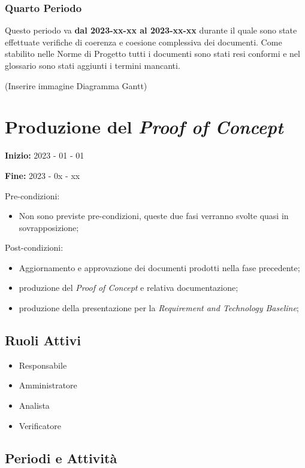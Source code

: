 \subsubsection{Quarto Periodo}
Questo periodo va \textbf{dal 2023-xx-xx al 2023-xx-xx} durante il quale sono state effettuate verifiche di coerenza e coesione complessiva dei documenti. Come stabilito nelle Norme di Progetto tutti i documenti sono stati resi conformi e nel glossario sono stati aggiunti i termini mancanti.

(Inserire immagine Diagramma Gantt)

\section{Produzione del {\it{Proof of Concept}}}

\textbf{Inizio:} 2023 - 01 - 01 

\textbf{Fine:} 2023 - 0x - xx

Pre-condizioni:
\begin{itemize}
    \item Non sono previste pre-condizioni, queste due fasi verranno svolte quasi in sovrapposizione;
\end{itemize}

Post-condizioni:
    \begin{itemize}
        \item Aggiornamento e approvazione dei documenti prodotti nella fase precedente;
        \item produzione del {\it{Proof of Concept}} e relativa documentazione;
        \item produzione della presentazione per la {\it{Requirement and Technology Baseline}};
    \end{itemize}

\subsection{Ruoli Attivi}
\begin{itemize}
    \item Responsabile
    \item Amministratore
    \item Analista
    \item Verificatore
\end{itemize}

\subsection{Periodi e Attività}

